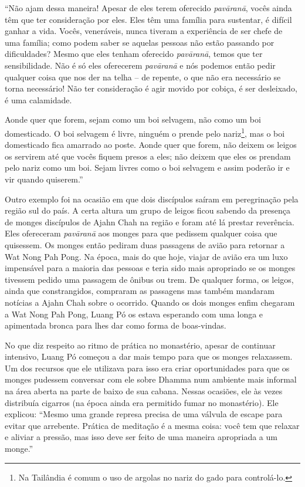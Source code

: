 ``Não ajam dessa maneira! Apesar de eles terem oferecido
\emph{pavāranā}, vocês ainda têm que ter consideração por eles. Eles têm
uma família para sustentar, é difícil ganhar a vida. Vocês, veneráveis,
nunca tiveram a experiência de ser chefe de uma família; como podem
saber se aquelas pessoas não estão passando por dificuldades? Mesmo que
eles tenham oferecido \emph{pavāranā}, temos que ter sensibilidade. Não
é só eles oferecerem \emph{pavāranā} e nós podemos então pedir qualquer
coisa que nos der na telha -- de repente, o que não era necessário se
torna necessário! Não ter consideração é agir movido por cobiça, é ser
desleixado, é uma calamidade.

Aonde quer que forem, sejam como um boi selvagem, não como um boi
domesticado. O boi selvagem é livre, ninguém o prende pelo
nariz\footnote{Na Tailândia é comum o uso de argolas no nariz do gado
  para controlá-lo.}, mas o boi domesticado fica amarrado ao poste.
Aonde quer que forem, não deixem os leigos os servirem até que vocês
fiquem presos a eles; não deixem que eles os prendam pelo nariz como um
boi. Sejam livres como o boi selvagem e assim poderão ir e vir quando
quiserem.''

Outro exemplo foi na ocasião em que dois discípulos saíram em
peregrinação pela região sul do país. A certa altura um grupo de leigos
ficou sabendo da presença de monges discípulos de Ajahn Chah na região e
foram até lá prestar reverência. Eles ofereceram \emph{pavāranā} aos
monges para que pedissem qualquer coisa que quisessem. Os monges então
pediram duas passagens de avião para retornar a Wat Nong Pah Pong. Na
época, mais do que hoje, viajar de avião era um luxo impensável para a
maioria das pessoas e teria sido mais apropriado se os monges tivessem
pedido uma passagem de ônibus ou trem. De qualquer forma, os leigos,
ainda que constrangidos, compraram as passagens mas também mandaram
notícias a Ajahn Chah sobre o ocorrido. Quando os dois monges enfim
chegaram a Wat Nong Pah Pong, Luang Pó os estava esperando com uma longa
e apimentada bronca para lhes dar como forma de boas-vindas.

No que diz respeito ao ritmo de prática no monastério, apesar de
continuar intensivo, Luang Pó começou a dar mais tempo para que os
monges relaxassem. Um dos recursos que ele utilizava para isso era criar
oportunidades para que os monges pudessem conversar com ele sobre Dhamma
num ambiente mais informal na área aberta na parte de baixo de sua
cabana. Nessas ocasiões, ele às vezes distribuía cigarros (na época
ainda era permitido fumar no monastério). Ele explicou: ``Mesmo uma
grande represa precisa de uma válvula de escape para evitar que
arrebente. Prática de meditação é a mesma coisa: você tem que relaxar e
aliviar a pressão, mas isso deve ser feito de uma maneira apropriada a
um monge.''

